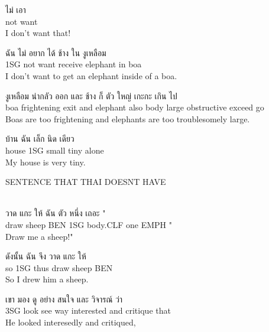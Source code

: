 \documentclass{book}
\begin{document}
	\begin{exe}
		\ex 
		\gll ไม่ เอา\\
		not want\\
		I don't want that!
	\end{exe}

	\begin{exe}
		\ex 
		\gll ฉัน ไม่ อยาก ได้ ช้าง ใน งูเหลือม\\
		\textsc{1SG} not want receive elephant in boa\\
		I don't want to get an elephant inside of a boa.
	\end{exe}

	\begin{exe}
		\ex 
		\gll งูเหลือม น่ากลัว ออก และ ช้าง ก็ ตัว ใหญ่ เกะกะ เกิน ไป\\
		boa frightening exit and elephant also body large obstructive exceed go\\
		Boas are too frightening and elephants are too troublesomely large.
	\end{exe}

	\begin{exe}
		\ex 
		\gll บ้าน ฉัน เล็ก นิด เดียว\\
		house \textsc{1SG} small tiny alone\\
		My house is very tiny.
	\end{exe}

	\begin{exe}
		\ex 
		\gll SENTENCE THAT THAI DOESNT HAVE\\
		\\
		
	\end{exe}

	\begin{exe}
		\ex 
		\gll วาด แกะ ให้ ฉัน ตัว หนึ่ง เถอะ "\\
		draw sheep \textsc{BEN} \textsc{1SG} body.\textsc{CLF} one \textsc{EMPH} "\\
		Draw me a sheep!"
	\end{exe}

	\begin{exe}
		\ex 
		\gll ดังนั้น ฉัน จึง วาด แกะ ให้\\
		so \textsc{1SG} thus draw sheep \textsc{BEN}\\
		So I drew him a sheep.
	\end{exe}

	\begin{exe}
		\ex 
		\gll เขา มอง ดู อย่าง สนใจ และ วิจารณ์ ว่า\\
		\textsc{3SG} look see way interested and critique that\\
		He looked interesedly and critiqued,
	\end{exe}
\end{document}
